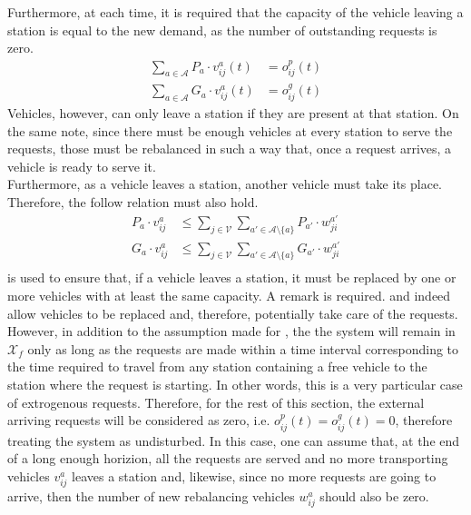 Furthermore, at each time, it is required that the capacity of the vehicle leaving a station is equal to the new demand, as the number of outstanding requests is zero. 
\begin{equation}
	\begin{aligned}
		\sum_{a \in \mathcal{A}}  P_a\cdot v^a_{ij}(t) &=   o^p_{ij}(t) \\
		\sum_{a \in \mathcal{A}} G_a \cdot v^a_{ij}(t) &=   o^g_{ij}(t)
	\end{aligned}
	\label{eq:no_more_than_request_f}
\end{equation}
Vehicles, however, can only leave a station if they are present at that station. On the same note, since there must be enough vehicles at every station to serve the requests, those must be rebalanced in such a way that, once a request arrives, a vehicle is ready to serve it. \\
 Furthermore, as a vehicle leaves a station, another vehicle must take its place. Therefore, the follow relation must also hold. 
 \begin{equation}
 	\begin{aligned}
 		P_a\cdot v^a_{ij} &\leq \sum_{j \in\mathcal{V}} \sum_{a'\in \mathcal{A} \setminus \{a\}}P_{a'}\cdot	w^{a'}_{ji}\\
 		G_a\cdot v^a_{ij} &\leq \sum_{j \in\mathcal{V}} \sum_{a'\in \mathcal{A} \setminus \{a\}}G_{a'}\cdot w^{a'}_{ji}\\
 	\end{aligned}
 	\label{eq:replace_vehicle}
 \end{equation}
 is used to ensure that, if a vehicle leaves a station, it must be replaced by one or more vehicles with at least the same capacity.
A remark is required.  and  indeed allow vehicles to be replaced and, therefore, potentially take care of the requests. However, in addition to the assumption made for , the the system will remain in $\mathcal{X}_f$ only as long as the requests are made within a time interval corresponding to the time required to travel from any station containing a free vehicle to the station where the request is starting. In other words, this is a very particular case of extrogenous requests. Therefore, for the rest of this section, the external arriving requests will be considered as zero, i.e. $o^p_{ij}(t) =  o^g_{ij}(t) = 0$, therefore treating the system as undisturbed. In this case, one can assume that, at the end of a long enough horizion, all the requests are served and no more transporting vehicles $v^a_{ij}$ leaves a station and, likewise, since no more requests are going to arrive, then the number of new rebalancing vehicles $w^a_{ij}$ should also be zero. 
